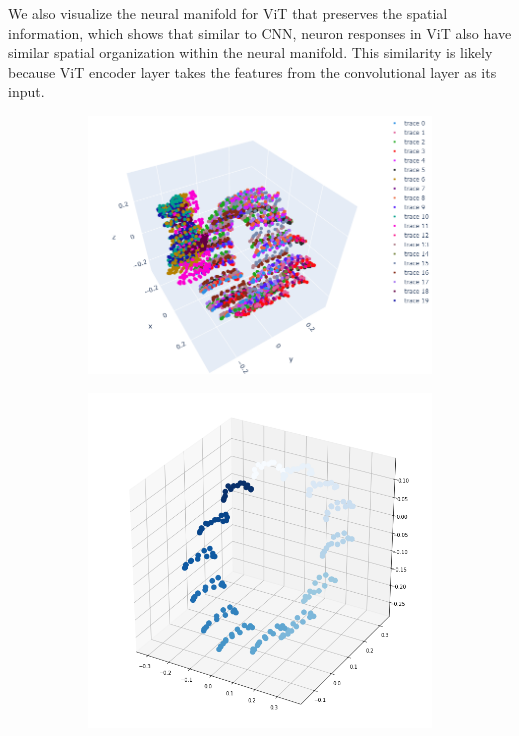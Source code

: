 We also visualize the neural manifold for ViT that preserves the spatial information, which shows that similar to CNN, neuron responses in ViT also have similar spatial organization within the neural manifold. This similarity is likely because ViT encoder layer takes the features from the convolutional layer as its input.
\begin{figure}[H]
\centering
\begin{subfigure}[b]{0.37\textwidth}
    \includegraphics[width=\textwidth]{figures/embeddings/vit-3d-layer1.png}
\end{subfigure}
\hfill
\begin{subfigure}[b]{0.3\textwidth}
    \includegraphics[width=\textwidth]{figures/embeddings/vit-spatial1.png}

\end{subfigure}
\end{figure}
